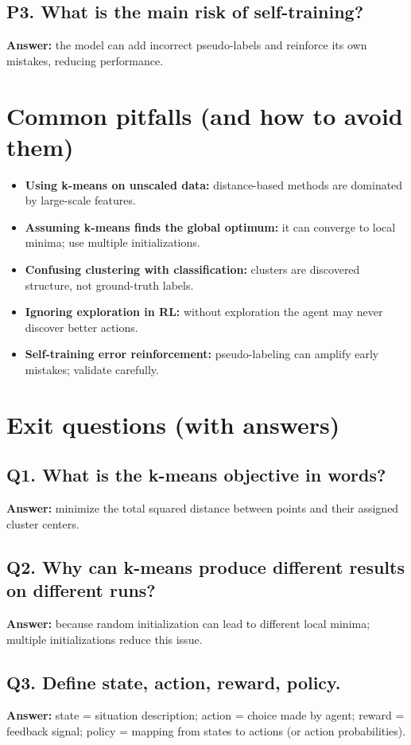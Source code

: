 \documentclass[11pt]{article}
\begin{document}
\subsection*{P3. What is the main risk of self-training?}
\textbf{Answer:} the model can add incorrect pseudo-labels and reinforce its own mistakes, reducing performance.

\section{Common pitfalls (and how to avoid them)}
\begin{itemize}[leftmargin=*]
  \item \textbf{Using k-means on unscaled data:} distance-based methods are dominated by large-scale features.
  \item \textbf{Assuming k-means finds the global optimum:} it can converge to local minima; use multiple initializations.
  \item \textbf{Confusing clustering with classification:} clusters are discovered structure, not ground-truth labels.
  \item \textbf{Ignoring exploration in RL:} without exploration the agent may never discover better actions.
  \item \textbf{Self-training error reinforcement:} pseudo-labeling can amplify early mistakes; validate carefully.
\end{itemize}

\section{Exit questions (with answers)}

\subsection*{Q1. What is the k-means objective in words?}
\textbf{Answer:} minimize the total squared distance between points and their assigned cluster centers.

\subsection*{Q2. Why can k-means produce different results on different runs?}
\textbf{Answer:} because random initialization can lead to different local minima; multiple initializations reduce this issue.

\subsection*{Q3. Define state, action, reward, policy.}
\textbf{Answer:} state = situation description; action = choice made by agent; reward = feedback signal; policy = mapping from states to actions (or action probabilities).
\end{document}
